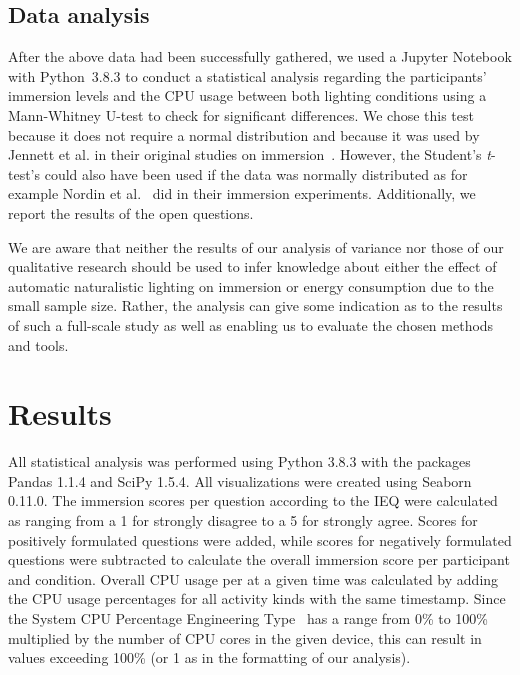 \documentclass[12pt,twoside,english]{article}
\begin{document}
\subsection{Data analysis}
\label{sect:data_analysis}

After the above data had been successfully gathered, we used a Jupyter Notebook with Python~3.8.3 to conduct a statistical analysis regarding the participants' immersion levels and the \gls{CPU} usage between both lighting conditions using a Mann-Whitney U-test to check for significant differences.
We chose this test because it does not require a normal distribution and because it was used by Jennett et al. in their original studies on immersion~\cite{jennett_measuring_2008}.
However, the Student's \textit{t}-test's could also have been used if the data was normally distributed as for example Nordin et al.~\cite{nordin_attention_2013} did in their immersion experiments.
Additionally, we report the results of the open questions.

We are aware that neither the results of our analysis of variance nor those of our qualitative research should be used to infer knowledge about either the effect of automatic naturalistic lighting on immersion or energy consumption due to the small sample size.
Rather, the analysis can give some indication as to the results of such a full-scale study as well as enabling us to evaluate the chosen methods and tools.

\section{Results}
\label{sect:results}

All statistical analysis was performed using Python 3.8.3 with the packages Pandas 1.1.4 and SciPy 1.5.4.
All visualizations were created using Seaborn 0.11.0.
The immersion scores per question according to the \gls{IEQ} were calculated as ranging from a 1 for strongly disagree to a 5 for strongly agree.
Scores for positively formulated questions were added, while scores for negatively formulated questions were subtracted to calculate the overall immersion score per participant and condition.
Overall \gls{CPU} usage per at a given time was calculated by adding the \gls{CPU} usage percentages for all activity kinds with the same timestamp.
Since the System CPU Percentage Engineering Type~\cite{apple_system_2020} has a range from 0\% to 100\% multiplied by the number of \gls{CPU} cores in the given device, this can result in values exceeding 100\% (or 1 as in the formatting of our analysis).
\end{document}
